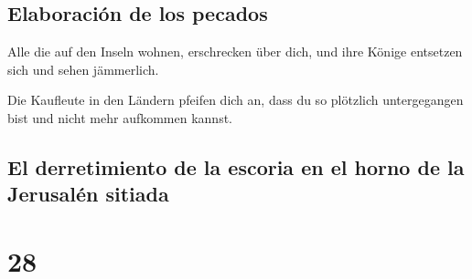 \hypertarget{elaboraciuxf3n-de-los-pecados}{%
\subsection{Elaboración de los
pecados}\label{elaboraciuxf3n-de-los-pecados}}

 Alle die auf den Inseln wohnen, erschrecken über dich,
und ihre Könige entsetzen sich und sehen jämmerlich.

 Die Kaufleute in den Ländern pfeifen dich an, dass du so
plötzlich untergegangen bist und nicht mehr aufkommen kannst.

\hypertarget{el-derretimiento-de-la-escoria-en-el-horno-de-la-jerusaluxe9n-sitiada}{%
\subsection{El derretimiento de la escoria en el horno de la Jerusalén
sitiada}\label{el-derretimiento-de-la-escoria-en-el-horno-de-la-jerusaluxe9n-sitiada}}

\hypertarget{section-27}{%
\section{28}\label{section-27}}


